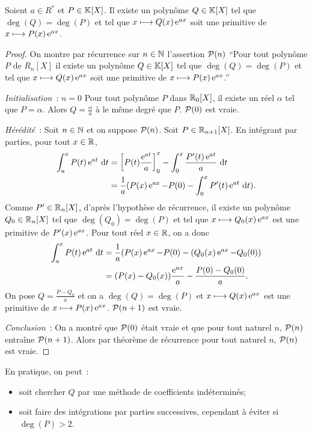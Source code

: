 \begin{prop}
  Soient \(a \in R^*\) et \(P \in \K[X]\). Il existe un polynôme \(Q \in \K[X]\) 
  tel que \(\deg(Q)=\deg(P)\) et tel que \(x \longmapsto Q(x)\e^{ax}\) soit une 
  primitive de \(x \longmapsto P(x)\e^{ax}\).
\end{prop}
\begin{proof}
  On montre par récurrence sur \(n \in \N\) l'assertion \(\P(n)\) ``Pour tout 
  polynôme \(P\) de \(R_n[X]\) il existe un polynôme \(Q \in \K[X]\) tel que 
  \(\deg(Q)=\deg(P)\) et tel que \(x \longmapsto Q(x)\e^{ax}\) soit une 
  primitive de \(x \longmapsto P(x)\e^{ax}\).''

  \emph{Initialisation}~: \(n=0\) Pour tout polynôme \(P\) dans \(\R_0[X]\), il 
  existe un réel \(\alpha\) tel que \(P=\alpha\). Alors \(Q=\frac{\alpha}{a}\) à 
  le même degré que \(P\). \(\P(0)\) est vraie.

  \emph{Hérédité}~: Soit \(n \in \N\) et on suppose \(\P(n)\). Soit \(P \in 
  \R_{n+1}[X]\). En intégrant par parties, pour tout \(x \in \R\),
  \begin{align}
    \int_a^x P(t)\e^{at}\,\diff t &= \left[P(t)\frac{\e^{at}}{a}\right]_0^x - 
    \int_0^x \frac{P'(t)\e^{at}}{a}\,\diff t \\
    & = \frac{1}{a}(P(x)\e^{ax} -P(0) - \int_0^x P'(t)\e^{at}\,\diff t ).
  \end{align}
  Comme \(P'\in\R_n[X]\), d'après l'hypothèse de récurrence, il existe un 
  polynôme \(Q_0 \in \R_n[X]\) tel que \(\deg(Q_0)=\deg(P)\) et tel que \(x 
  \longmapsto Q_0(x)\e^{ax}\) est une primitive de \(P'(x)\e^{ax}\). Pour tout 
  réel \(x \in \R\), on a donc
  \begin{align}
    \int_a^x P(t)\e^{at}\,\diff t &= \frac{1}{a}(P(x)\e^{ax} -P(0) - 
    (Q_0(x)\e^{ax}-Q_0(0))\\
    &=(P(x)-Q_0(x))\frac{\e^{ax}}{a} - \frac{P(0)-Q_0(0)}{a}.
  \end{align}
  On pose \(Q = \frac{P-Q_0}{a}\) et on a \(\deg(Q)=\deg(P)\) et \(x\longmapsto 
  Q(x)\e^{ax}\) est une primitive de \(x\longmapsto P(x)\e^{ax}\). \(\P(n+1)\) 
  est vraie.

  \emph{Conclusion}~: On a montré que \(\P(0)\) était vraie et que pour tout 
  naturel \(n\), \(\P(n)\) entraîne \(\P(n+1)\). Alors par théorème de 
  récurrence pour tout naturel \(n\), \(\P(n)\) est vraie.
\end{proof}

En pratique, on peut~:
\begin{itemize}
  \item soit chercher \(Q\) par une méthode de coefficients indéterminés;
  \item soit faire des intégrations par parties successives, cependant à éviter 
    si \(\deg(P) >2\).
\end{itemize}

